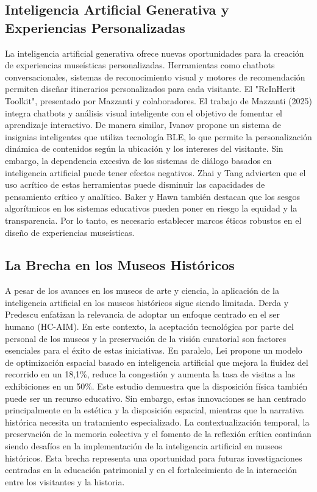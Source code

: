 \documentclass[pdflatex,sn-mathphys-num]{sn-jnl}%
\theoremstyle{thmstyleone}%
\theoremstyle{thmstyletwo}%
\theoremstyle{thmstylethree}%
\begin{document}
\subsection{Inteligencia Artificial Generativa y Experiencias Personalizadas}
La inteligencia artificial generativa ofrece nuevas oportunidades para la creación de experiencias museísticas personalizadas. Herramientas como chatbots conversacionales, sistemas de reconocimiento visual y motores de recomendación permiten diseñar itinerarios personalizados para cada visitante. El "ReInHerit Toolkit", presentado por Mazzanti y colaboradores. El trabajo de Mazzanti (2025) integra chatbots y análisis visual inteligente con el objetivo de fomentar el aprendizaje interactivo. De manera similar, Ivanov \cite{ivanov2024advanced} propone un sistema de insignias inteligentes que utiliza tecnología BLE, lo que permite la personalización dinámica de contenidos según la ubicación y los intereses del visitante.
Sin embargo, la dependencia excesiva de los sistemas de diálogo basados en inteligencia artificial puede tener efectos negativos. Zhai y Tang \cite{zhai2024effects} advierten que el uso acrítico de estas herramientas puede disminuir las capacidades de pensamiento crítico y analítico. Baker y Hawn \cite{Baker2022Algorithmic} también destacan que los sesgos algorítmicos en los sistemas educativos pueden poner en riesgo la equidad y la transparencia. Por lo tanto, es necesario establecer marcos éticos robustos en el diseño de experiencias museísticas.

\subsection{La Brecha en los Museos Históricos}
A pesar de los avances en los museos de arte y ciencia, la aplicación de la inteligencia artificial en los museos históricos sigue siendo limitada. Derda y Predescu \cite{Derda2025HumanCentric} enfatizan la relevancia de adoptar un enfoque centrado en el ser humano (HC-AIM). En este contexto, la aceptación tecnológica por parte del personal de los museos y la preservación de la visión curatorial son factores esenciales para el éxito de estas iniciativas. En paralelo, Lei \cite{lei2025artificial} propone un modelo de optimización espacial basado en inteligencia artificial que mejora la fluidez del recorrido en un 18,1\%, reduce la congestión y aumenta la tasa de visitas a las exhibiciones en un 50\%. Este estudio demuestra que la disposición física también puede ser un recurso educativo.
Sin embargo, estas innovaciones se han centrado principalmente en la estética y la disposición espacial, mientras que la narrativa histórica necesita un tratamiento especializado. La contextualización temporal, la preservación de la memoria colectiva y el fomento de la reflexión crítica continúan siendo desafíos en la implementación de la inteligencia artificial en museos históricos. Esta brecha representa una oportunidad para futuras investigaciones centradas en la educación patrimonial y en el fortalecimiento de la interacción entre los visitantes y la historia.
\end{document}
